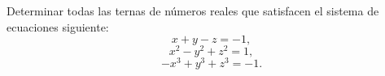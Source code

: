 Determinar todas las ternas de números reales que satisfacen el sistema de ecuaciones siguiente:
\[x+y-z=-1,\]
\[x^2-y^2+z^2=1,\]
\[-x^3+y^3+z^3=-1.\]